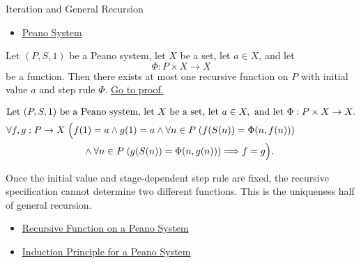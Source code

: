 \begin{topicbox}{Iteration and General Recursion}
\begin{remark*}[Dependencies]
\begin{itemize}
  \item \hyperref[def:peano-system]{Peano System}
\end{itemize}
\end{remark*}

\begin{tcolorbox}[colback=thmbox, colframe=thmborder, arc=2pt,
  left=6pt, right=6pt, top=4pt, bottom=4pt,
  title={\small\textbf{Theorem (Recursive Specification Is Well-Defined)}},
  fonttitle=\small\bfseries]
\begin{theorem}
\label{thm:recursive-specification-well-defined}
Let $(P,S,1)$ be a Peano system, let $X$ be a set, let $a \in X$, and let
\[
\Phi : P \times X \to X
\]
be a function. Then there exists at most one recursive function on $P$ with
initial value $a$ and step rule $\Phi$.
\hyperref[prf-recursive-specification-well-defined]{Go to proof.}
\end{theorem}
\end{tcolorbox}

\begin{remark*}
\[
\begin{aligned}
&\text{Let } (P,S,1) \text{ be a Peano system, let } X \text{ be a set, let } a \in X, \text{ and let } \Phi : P \times X \to X.\\
&\forall f,g : P \to X\;\Bigl(
f(1)=a \land g(1)=a \land
\forall n \in P\;(f(S(n))=\Phi(n,f(n))) \\
&\qquad\qquad\qquad\qquad\land
\forall n \in P\;(g(S(n))=\Phi(n,g(n)))
\Longrightarrow f=g\Bigr).
\end{aligned}
\]
\end{remark*}

\begin{remark*}[Interpretation]
Once the initial value and stage-dependent step rule are fixed, the recursive
specification cannot determine two different functions. This is the uniqueness
half of general recursion.
\end{remark*}

\begin{remark*}[Dependencies]
\begin{itemize}
  \item \hyperref[def:recursive-function-on-peano-system]{Recursive Function on a Peano System}
  \item \hyperref[thm:induction-principle-for-peano-system]{Induction Principle for a Peano System}
\end{itemize}
\end{remark*}


\end{topicbox}
